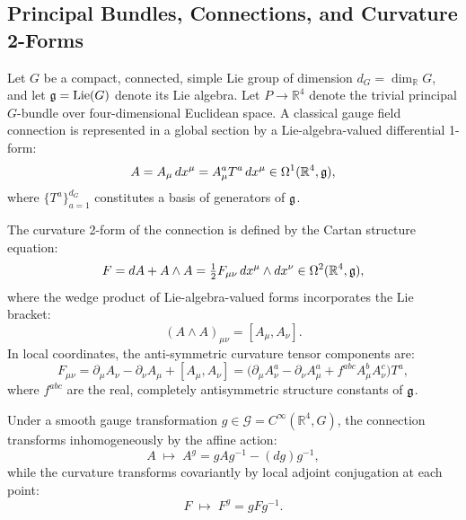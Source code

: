 \subsection{Principal Bundles, Connections, and Curvature 2-Forms}
\label{subsec:bundles_and_curvature}
Let $G$ be a compact, connected, simple Lie group of dimension $d_G = \dim_{\mathbb{R}} G$, and let $\mathfrak{g} = \mathrm{Lie}(G)$ denote its Lie algebra. Let $P \to \mathbb{R}^4$ denote the trivial principal $G$-bundle over four-dimensional Euclidean space. A classical gauge field connection is represented in a global section by a Lie-algebra-valued differential 1-form:
\begin{equation}
A = A_\mu \, dx^\mu = A_\mu^a T^a \, dx^\mu \in \Omega^1(\mathbb{R}^4, \mathfrak{g}),
\end{equation}
where $\{T^a\}_{a=1}^{d_G}$ constitutes a basis of generators of $\mathfrak{g}$.

The curvature 2-form of the connection is defined by the Cartan structure equation:
\begin{equation}
\label{eq:curvature_2form_def}
F = dA + A \wedge A = \tfrac{1}{2} F_{\mu\nu} \, dx^\mu \wedge dx^\nu \in \Omega^2(\mathbb{R}^4, \mathfrak{g}),
\end{equation}
where the wedge product of Lie-algebra-valued forms incorporates the Lie bracket:
\begin{equation}
(A \wedge A)_{\mu\nu} = [A_\mu, A_\nu].
\end{equation}
In local coordinates, the anti-symmetric curvature tensor components are:
\begin{equation}
F_{\mu\nu} = \partial_\mu A_\nu - \partial_\nu A_\mu + [A_\mu, A_\nu] = \bigl( \partial_\mu A_\nu^a - \partial_\nu A_\mu^a + f^{abc} A_\mu^b A_\nu^c \bigr) T^a,
\end{equation}
where $f^{abc}$ are the real, completely antisymmetric structure constants of $\mathfrak{g}$.

Under a smooth gauge transformation $g \in \mathcal{G} = C^\infty(\mathbb{R}^4, G)$, the connection transforms inhomogeneously by the affine action:
\begin{equation}
A \;\mapsto\; A^g = g A g^{-1} - (dg) g^{-1},
\end{equation}
while the curvature transforms covariantly by local adjoint conjugation at each point:
\begin{equation}
F \;\mapsto\; F^g = g F g^{-1}.
\end{equation}

